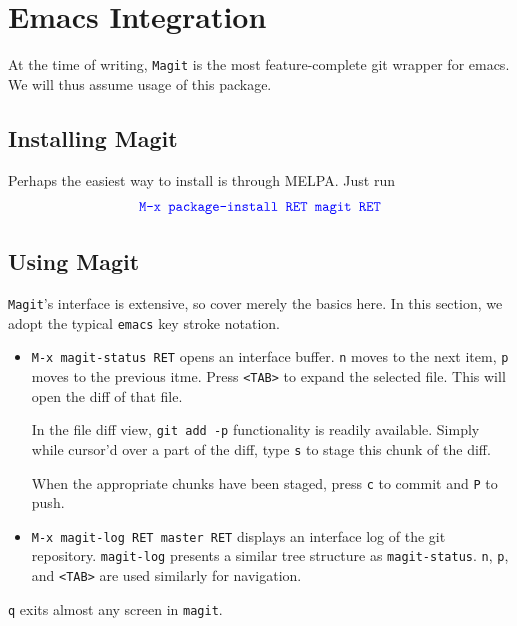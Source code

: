 \documentclass[12pt]{report}
\newcommand\code[1]{{\color{blue}\texttt{#1}}}
\begin{document}
\chapter{Emacs Integration}

At the time of writing, \code{Magit} is the most feature-complete git
wrapper for emacs. We will thus assume usage of this package.

\section{Installing Magit}
Perhaps the easiest way to install is through MELPA. Just run
\[
  \code{M-x package-install RET magit RET}
\]

\section{Using Magit}
\code{Magit}'s interface is extensive, so cover merely the basics
here. In this section, we adopt the typical \texttt{emacs} key stroke
notation.

\begin{itemize}
\item \code{M-x magit-status RET} opens an interface buffer. \code{n} moves to
  the next item, \code{p} moves to the previous itme. Press
  \code{<TAB>} to expand the selected file. This will open the diff of
  that file.
    
  In the file diff view, \code{git add -p} functionality is readily
  available. Simply while cursor'd over a part of the diff, type
  \code{s} to stage this chunk of the diff.

  When the appropriate chunks have been staged, press \code{c} to
  commit and \code{P} to push.
  
\item \code{M-x magit-log RET master RET} displays an interface log of
  the git repository. \code{magit-log} presents a similar tree
  structure as \code{magit-status}. \code{n}, \code{p}, and
  \code{<TAB>} are used similarly for navigation.
\end{itemize}

\code{q} exits almost any screen in \code{magit}.
\end{document}
